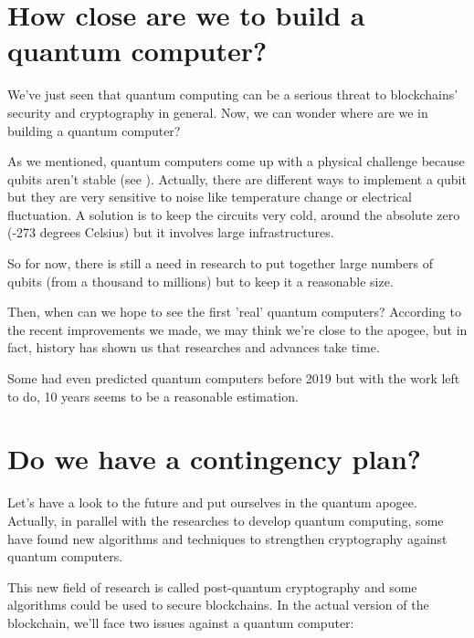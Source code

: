 \section{How close are we to build a quantum computer?}

We've just seen that quantum computing can be a serious threat to blockchains' security and cryptography in general. Now, we can wonder where are we in building a quantum computer? \newline

As we mentioned, quantum computers come up with a physical challenge because qubits aren't stable (see \cite{closeToQuantum}). Actually, there are different ways to implement a qubit but they are very sensitive to noise like temperature change or electrical fluctuation. A solution is to keep the circuits very cold, around the absolute zero (-273 degrees Celsius) but it involves large infrastructures.

So for now, there is still a need in research to put together large numbers of qubits (from a thousand to millions) but to keep it a reasonable size. \newline

Then, when can we hope to see the first 'real' quantum computers? According to the recent improvements we made, we may think we're close to the apogee, but in fact, history has shown us that researches and advances take time. \newline

Some had even predicted quantum computers before 2019 but with the work left to do, 10 years seems to be a reasonable estimation.

\section{Do we have a contingency plan?}

Let's have a look to the future and put ourselves in the quantum apogee. Actually, in parallel with the researches to develop quantum computing, some have found new algorithms and techniques to strengthen cryptography against quantum computers.

This new field of research is called post-quantum cryptography and some algorithms could be used to secure blockchains. In the actual version of the blockchain, we'll face two issues against a quantum computer: \newline

